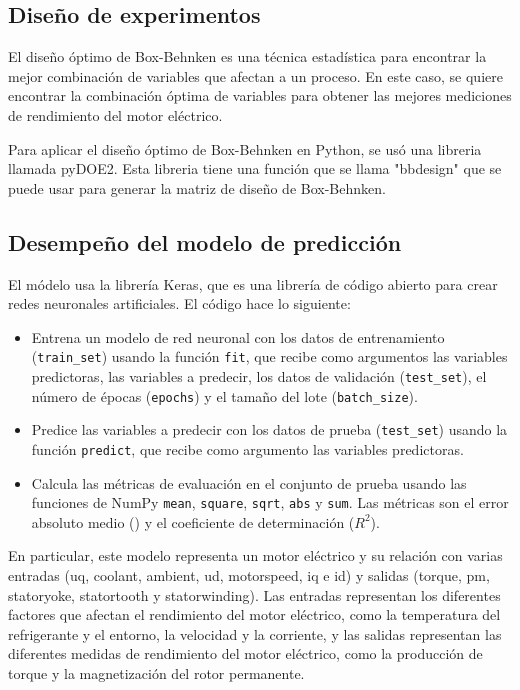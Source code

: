 \documentclass{article}
\begin{document}
\subsection{Diseño de experimentos}

El diseño óptimo de Box-Behnken es una técnica estadística para encontrar la mejor combinación de variables que afectan a un proceso. En este caso, se quiere encontrar la combinación óptima de variables para obtener las mejores mediciones de rendimiento del motor eléctrico. 

Para aplicar el diseño óptimo de Box-Behnken en Python, se usó una libreria llamada pyDOE2. Esta libreria tiene una función que se llama "bbdesign" que se puede usar para generar la matriz de diseño de Box-Behnken.



\subsection{Desempeño del modelo de predicción}

El módelo usa la librería Keras, que es una librería de código abierto para crear redes neuronales artificiales. El código hace lo siguiente:

\begin{itemize}
\item Entrena un modelo de red neuronal con los datos de entrenamiento (\lstinline{train_set}) usando la función \lstinline{fit}, que recibe como argumentos las variables predictoras, las variables a predecir, los datos de validación (\lstinline{test_set}), el número de épocas (\lstinline{epochs}) y el tamaño del lote (\lstinline{batch_size}).
\item Predice las variables a predecir con los datos de prueba (\lstinline{test_set}) usando la función \lstinline{predict}, que recibe como argumento las variables predictoras.
\item Calcula las métricas de evaluación en el conjunto de prueba usando las funciones de NumPy \lstinline{mean}, \lstinline{square}, \lstinline{sqrt}, \lstinline{abs} y \lstinline{sum}. Las métricas son  el error absoluto medio () y el coeficiente de determinación ($R^{2}$).
\end{itemize}



En particular, este modelo representa un motor eléctrico y su relación con varias entradas (u\textunderscore q, coolant, ambient, u\textunderscore d, motor\textunderscore speed, i\textunderscore q e i\textunderscore d) y salidas (torque, pm, stator\textunderscore yoke, stator\textunderscore tooth y stator\textunderscore winding). Las entradas representan los diferentes factores que afectan el rendimiento del motor eléctrico, como la temperatura del refrigerante y el entorno, la velocidad y la corriente, y las salidas representan las diferentes medidas de rendimiento del motor eléctrico, como la producción de torque y la magnetización del rotor permanente.
\end{document}
